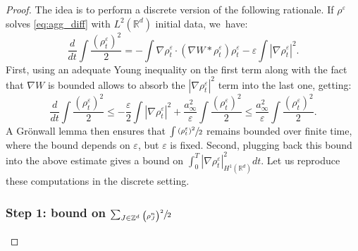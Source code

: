 \documentclass[11pt]{article}
\numberwithin{equation}{section}
\def\RR{\mathbb{R}}
\def\ZZ{\mathbb{Z}}
\def\eps{\varepsilon}
\theoremstyle{plain}
\theoremstyle{definition}
\begin{document}
\begin{proof}
The idea is to perform a discrete version of the following rationale. If $\rho^\eps$ solves \eqref{eq:agg_diff} with $L^2(\RR^d)$ initial data, we~have:
\[%
\frac{d}{dt} \int \frac{(\rho_t^\eps)^2}{2} = - \int \nabla \rho_t^\eps \cdot (\nabla W * \rho_t^\eps) \rho_t^\eps - \eps \int |\nabla \rho_t^\eps|^2.
\]
First, using an adequate Young inequality on the first term along with the fact that $\nabla W$ is bounded allows to absorb the $|\nabla \rho_t^\eps|^2$ term into the last one, getting:
\[
\frac{d}{dt} \int \frac{(\rho_t^\eps)^2}{2} \leq
- \frac{\eps}{2} \int |\nabla \rho_t^\eps|^2 + \frac{a_\infty^2}{\eps} \int \frac{(\rho_t^\eps)^2}{2} \leq \frac{a_\infty^2}{\eps} \int \frac{(\rho_t^\eps)^2}{2}.
\]
A Grönwall lemma then ensures that $\int \sfrac{(\rho_t^\eps)^2}{2}$ remains bounded over finite time, where the bound depends on $\eps$, but $\eps$ is fixed. Second, plugging back this bound into the above estimate gives a bound on $\int_0^T |\nabla \rho_t^\eps|_{H^1(\RR^d)}^2 dt$. Let us reproduce these computations in the discrete setting.

\subsubsection*{Step 1: bound on $\sum_{J \in \ZZ^d} \sfrac{\big(\rho_J^n\big)^2}{2}$}


\end{proof}
\end{document}
